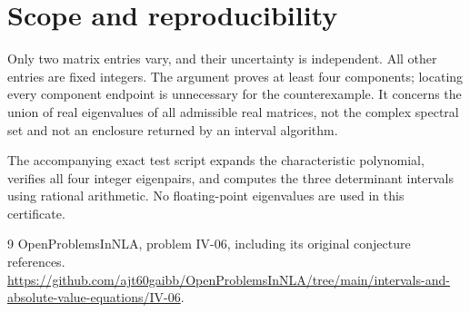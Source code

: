 \documentclass[11pt,a4paper]{article}
\theoremstyle{remark}\newtheorem{remark}[theorem]{Remark}
\newcommand{\repo}[1]{\url{https://github.com/ajt60gaibb/OpenProblemsInNLA/tree/main/intervals-and-absolute-value-equations/#1}}
\begin{document}
\section{Scope and reproducibility}
Only two matrix entries vary, and their uncertainty is independent. All other entries are fixed integers. The argument proves at least four components; locating every component endpoint is unnecessary for the counterexample. It concerns the union of real eigenvalues of all admissible real matrices, not the complex spectral set and not an enclosure returned by an interval algorithm.

The accompanying exact test script expands the characteristic polynomial, verifies all four integer eigenpairs, and computes the three determinant intervals using rational arithmetic. No floating-point eigenvalues are used in this certificate.
\begin{thebibliography}{9}
 OpenProblemsInNLA, problem IV-06, including its original conjecture references. \repo{IV-06}.
\end{thebibliography}
\end{document}
